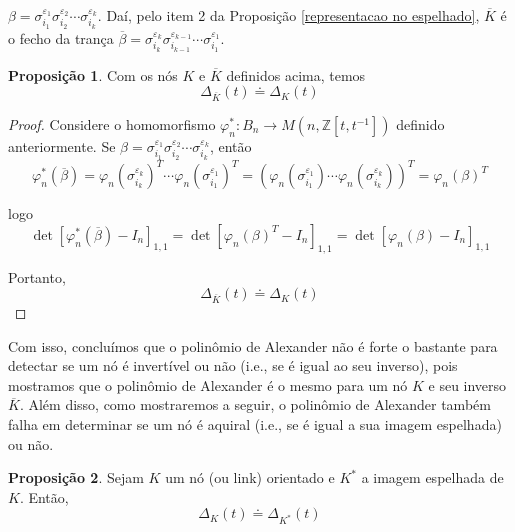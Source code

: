 \documentclass[a4paper,portuguese,11pt,twoside, leqno]{book}
\theoremstyle{definition}
\newtheorem{prop}{Proposição}[section]
\begin{document}
	$\beta = \sigma_{i_1}^{\varepsilon_1}\sigma_{i_2}^{\varepsilon_2}\cdots\sigma_{i_k}^{\varepsilon_k}$. Daí, pelo item 2 da Proposição \eqref{representacao no espelhado}, $\overline{K}$ é o fecho da trança $\overline{\beta} = \sigma_{i_k}^{\varepsilon_k}\sigma_{i_{k-1}}^{\varepsilon_{k-1}}\cdots\sigma_{i_1}^{\varepsilon_1}$. 
	\begin{prop}
		\label{polinomio de Alexander para nos invertidos}
		Com os nós $K$ e $\overline{K}$ definidos acima, temos
		\begin{equation*}
		\Delta_{\overline{K}}(t) \doteq \Delta_K(t)
		\end{equation*}
	\end{prop}
	\begin{proof}
		Considere o homomorfismo $\varphi_n^\ast: B_n\to M(n, \mathbb{Z}[t,t^{-1}])$ definido anteriormente. Se $\beta=\sigma_{i_1}^{\varepsilon_1}\sigma_{i_2}^{\varepsilon_2}\cdots\sigma_{i_k}^{\varepsilon_k}$, então
		\begin{equation*}
		\varphi_n^\ast(\overline{\beta}) = \varphi_n(\sigma_{i_k}^{\varepsilon_k})^T\cdots\varphi_n(\sigma_{i_1}^{\varepsilon_1})^T = (\varphi_n(\sigma_{i_1}^{\varepsilon_1})\cdots\varphi_n(\sigma_{i_k}^{\varepsilon_k}))^T = \varphi_n(\beta)^T
		\end{equation*}
		
		\par\vspace{0.3cm} logo
		\begin{equation*}
		\det[\varphi_n^\ast(\overline{\beta}) - I_n]_{1,1} = \det[\varphi_n(\beta)^T - I_n]_{1,1} = \det[\varphi_n(\beta) - I_n]_{1,1}
		\end{equation*}
		\par\vspace{0.3cm} Portanto,
		\begin{equation*}
		\Delta_{\overline{K}}(t) \doteq \Delta_K(t)
		\end{equation*}
	\end{proof}
	\par\vspace{0.3cm} Com isso, concluímos que o polinômio de Alexander não é forte o bastante para detectar se um nó é invertível ou não (i.e., se é igual ao seu inverso), pois mostramos que o polinômio de Alexander é o mesmo para um nó $K$ e seu inverso $\overline{K}$. Além disso, como mostraremos a seguir, o polinômio de Alexander também falha em determinar se um nó é aquiral (i.e., se é igual a sua imagem espelhada) ou não. 
	\begin{prop}
		\label{polinomio de Alexander para nos espelhados}
		Sejam $K$ um nó (ou link) orientado e $K^\ast$ a imagem espelhada de $K$. Então,
		\begin{equation*}
		\Delta_K(t)\doteq\Delta_{K^\ast}(t)
		\end{equation*} 
	\end{prop}
\end{document}
